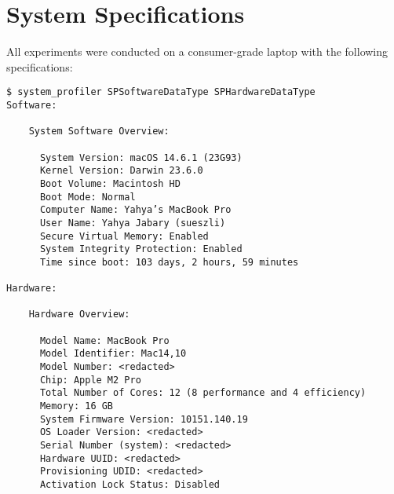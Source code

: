 \documentclass[manuscript]{acmart}
\begin{document}




\appendix

\section{System Specifications}

All experiments were conducted on a consumer-grade laptop with the following specifications:

\begin{footnotesize}
\begin{verbatim}
$ system_profiler SPSoftwareDataType SPHardwareDataType
Software:

    System Software Overview:

      System Version: macOS 14.6.1 (23G93)
      Kernel Version: Darwin 23.6.0
      Boot Volume: Macintosh HD
      Boot Mode: Normal
      Computer Name: Yahya’s MacBook Pro
      User Name: Yahya Jabary (sueszli)
      Secure Virtual Memory: Enabled
      System Integrity Protection: Enabled
      Time since boot: 103 days, 2 hours, 59 minutes

Hardware:

    Hardware Overview:

      Model Name: MacBook Pro
      Model Identifier: Mac14,10
      Model Number: <redacted>
      Chip: Apple M2 Pro
      Total Number of Cores: 12 (8 performance and 4 efficiency)
      Memory: 16 GB
      System Firmware Version: 10151.140.19
      OS Loader Version: <redacted>
      Serial Number (system): <redacted>
      Hardware UUID: <redacted>
      Provisioning UDID: <redacted>
      Activation Lock Status: Disabled
\end{verbatim}
\end{footnotesize}

\end{document}
